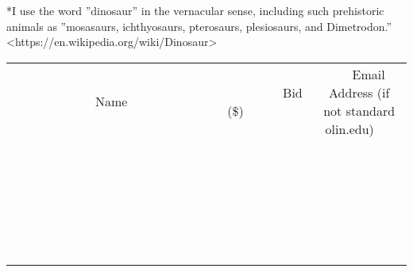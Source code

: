 \documentclass[11pt]{article}
\begin{document}
*I use the word ”dinosaur” in the vernacular sense, including such prehistoric animals as ”mosasaurs, ichthyosaurs, pterosaurs, plesiosaurs, and Dimetrodon.” \textless https://en.wikipedia.org/wiki/Dinosaur\textgreater
\\[6ex]
\begin{tabular}{c c c}
~~~~~~~~~~~~~Name~~~~~~~~~~~~~ & ~~~~~~~~~Bid (\$)~~~~~~~~~  & ~~~Email Address (if not standard olin.edu)~~~\\
 & & \\
\hline
 & & \\
\hline
 & & \\
\hline
 & & \\
\hline
 & & \\
\hline
 & & \\
\hline
 & & \\
\hline
 & & \\
\hline
 & & \\
\hline
 & & \\
\hline
 & & \\
\hline
 & & \\
\hline
 & & \\
\hline
 & & \\
\hline
 & & \\
\hline
 & & \\
\hline
 & & \\
\hline
 & & \\
\hline
 & & \\
\hline
 & & \\
\hline
 & & \\
\hline
 & & \\
\hline
 & & \\
\hline
 & & \\
\hline
 & & \\
\hline
 & & \\
\hline
\end{tabular}
\newpage
\end{document}
